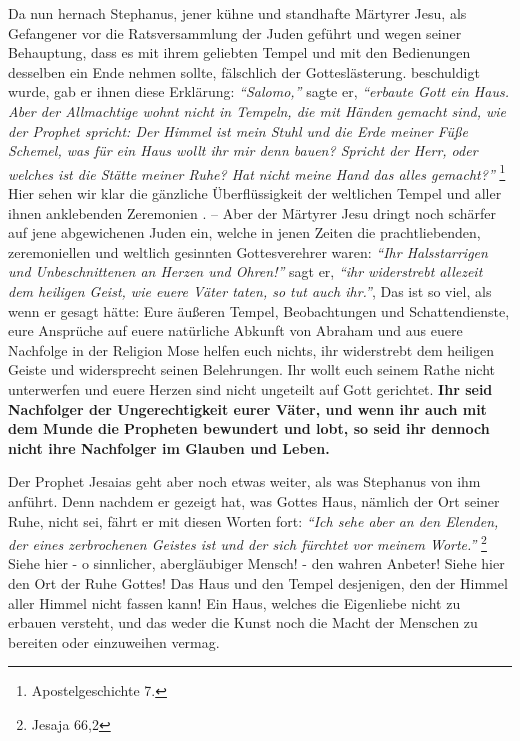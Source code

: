   
Da nun hernach Stephanus, jener kühne und standhafte Märtyrer Jesu, als
Gefangener vor die Ratsversammlung der Juden geführt und wegen seiner
Behauptung, dass es mit ihrem geliebten Tempel und mit den Bedienungen desselben
ein Ende nehmen sollte, fälschlich der Gotteslästerung. 
beschuldigt wurde, gab
er ihnen diese Erklärung:
\textit{"`Salomo,"'}  sagte er,
\textit{"`erbaute Gott ein Haus. Aber der Allmachtige wohnt nicht in Tempeln,
die mit Händen gemacht sind, wie der Prophet spricht: Der Himmel ist mein Stuhl
und die Erde meiner Füße Schemel, was für ein Haus wollt ihr mir denn bauen?
Spricht der Herr, oder welches ist die Stätte meiner Ruhe? Hat nicht meine Hand
das alles gemacht?"'}
\footnote{Apostelgeschichte 7.}
Hier sehen wir klar die gänzliche Überflüssigkeit der weltlichen
Tempel und aller ihnen anklebenden Zeremonien . -- Aber der
Märtyrer Jesu  dringt
noch schärfer auf jene abgewichenen Juden  ein, welche in jenen Zeiten die
prachtliebenden, zeremoniellen und weltlich gesinnten Gottesverehrer waren:
\textit{"`Ihr Halsstarrigen und Unbeschnittenen an Herzen und Ohren!"'} sagt er,
\textit{"`ihr widerstrebt allezeit dem heiligen Geist, wie euere Väter taten,
so tut auch
ihr."'}, Das ist so viel, als wenn er gesagt hätte: Eure äußeren Tempel,
Beobachtungen und Schattendienste, eure Ansprüche auf euere natürliche Abkunft
von Abraham   und aus euere Nachfolge in der Religion
Mose  helfen euch nichts,
ihr widerstrebt dem heiligen Geiste und widersprecht seinen Belehrungen. Ihr
wollt euch seinem Rathe nicht unterwerfen und euere Herzen sind nicht ungeteilt
auf Gott gerichtet. \label{ref:05_05_wahre_nachfolge}
\textbf{Ihr seid Nachfolger der Ungerechtigkeit eurer Väter, und
wenn ihr auch mit dem Munde die Propheten bewundert und lobt, so seid ihr
dennoch nicht ihre Nachfolger im Glauben und Leben.} 

\medskip

Der Prophet Jesaias  geht aber noch etwas weiter, als
was Stephanus von ihm
anführt. Denn nachdem er gezeigt hat, was Gottes Haus, nämlich der Ort seiner
Ruhe, nicht sei, fährt er mit diesen Worten fort:
\textit{"`Ich sehe aber an den Elenden, der eines zerbrochenen Geistes ist und
der sich fürchtet vor meinem Worte."'}
\footnote{Jesaja 66,2}
Siehe hier - o sinnlicher, abergläubiger Mensch! - den
wahren Anbeter! Siehe hier den Ort der Ruhe Gottes! Das Haus und den Tempel
desjenigen, den der Himmel aller Himmel nicht fassen kann! Ein Haus, welches
die Eigenliebe nicht zu erbauen versteht, und das weder die Kunst noch die Macht
der Menschen zu bereiten oder einzuweihen vermag.

